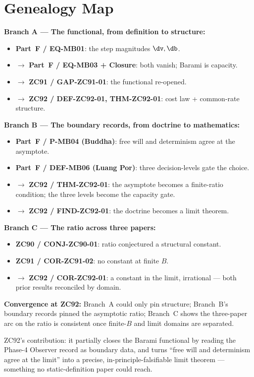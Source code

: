 \documentclass[12pt, a4paper]{article}
\begin{document}
\section{Genealogy Map}
\label{sec:genealogy-zc92}
\begin{genealogybox}[title={How ZC92's Key Objects Trace Back}]

\textbf{Branch A --- The functional, from definition to structure:}
\begin{itemize}[leftmargin=2em, noitemsep]
  \item \textbf{Part~F / EQ-MB01}: the step magnitudes $\dv,\db$.
  \item $\to$ \textbf{Part~F / EQ-MB03 + Closure}: both vanish; Barami is
    capacity.
  \item $\to$ \textbf{ZC91 / GAP-ZC91-01}: the functional re-opened.
  \item $\to$ \textbf{ZC92 / DEF-ZC92-01, THM-ZC92-01}: cost law +
    common-rate structure.
\end{itemize}

\textbf{Branch B --- The boundary records, from doctrine to mathematics:}
\begin{itemize}[leftmargin=2em, noitemsep]
  \item \textbf{Part~F / P-MB04 (Buddha)}: free will and determinism
    agree at the asymptote.
  \item \textbf{Part~F / DEF-MB06 (Luang Por)}: three decision-levels
    gate the choice.
  \item $\to$ \textbf{ZC92 / THM-ZC92-01}: the asymptote becomes a
    finite-ratio condition; the three levels become the capacity gate.
  \item $\to$ \textbf{ZC92 / FIND-ZC92-01}: the doctrine becomes a limit
    theorem.
\end{itemize}

\textbf{Branch C --- The ratio across three papers:}
\begin{itemize}[leftmargin=2em, noitemsep]
  \item \textbf{ZC90 / CONJ-ZC90-01}: ratio conjectured a structural
    constant.
  \item \textbf{ZC91 / COR-ZC91-02}: no constant at finite $B$.
  \item $\to$ \textbf{ZC92 / COR-ZC92-01}: a constant in the limit,
    irrational --- both prior results reconciled by domain.
\end{itemize}

\textbf{Convergence at ZC92:}
Branch~A could only pin structure; Branch~B's boundary records pinned the
asymptotic ratio; Branch~C shows the three-paper arc on the ratio is
consistent once finite-$B$ and limit domains are separated.

ZC92's contribution: it partially closes the Barami functional by reading
the Phase-4 Observer record as boundary data, and turns ``free will and
determinism agree at the limit'' into a precise, in-principle-falsifiable
limit theorem --- something no static-definition paper could reach.
\end{genealogybox}
\end{document}
